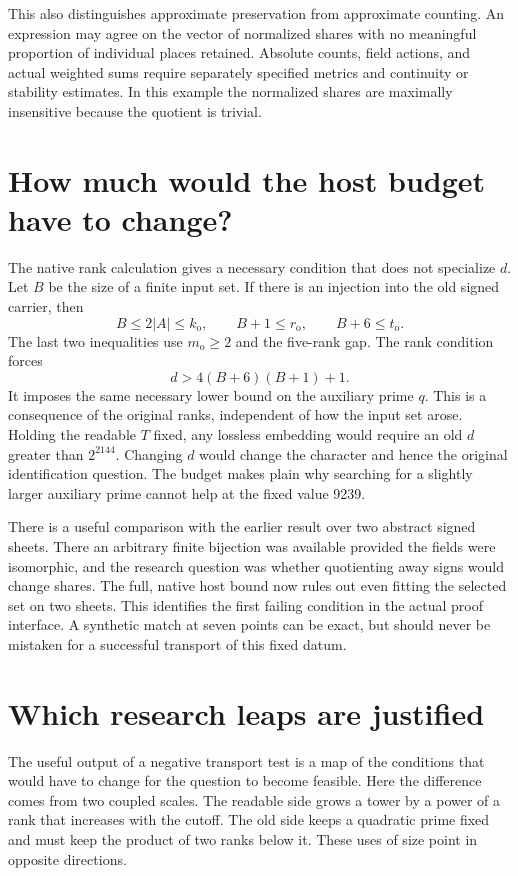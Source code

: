 \documentclass[12pt,letterpaper]{article}
\begin{document}
This also distinguishes approximate preservation from approximate counting. An expression may agree on the vector of normalized shares with no meaningful proportion of individual places retained. Absolute counts, field actions, and actual weighted sums require separately specified metrics and continuity or stability estimates. In this example the normalized shares are maximally insensitive because the quotient is trivial.


\section{How much would the host budget have to change?}\label{sec:primebudget}
The native rank calculation gives a necessary condition that does not specialize $d$. Let $B$ be the size of a finite input set. If there is an injection into the old signed carrier, then
\[
 B\le2|A|\le k_{\mathrm o},\qquad
 B+1\le r_{\mathrm o},\qquad
 B+6\le t_{\mathrm o}.
\]
The last two inequalities use $m_{\mathrm o}\ge2$ and the five-rank gap. The rank condition forces
\[
                  d>4(B+6)(B+1)+1.
\]
It imposes the same necessary lower bound on the auxiliary prime $q$. This is a consequence of the original ranks, independent of how the input set arose. Holding the readable $T$ fixed, any lossless embedding would require an old $d$ greater than $2^{2144}$. Changing $d$ would change the character and hence the original identification question. The budget makes plain why searching for a slightly larger auxiliary prime cannot help at the fixed value 9239.

There is a useful comparison with the earlier result over two abstract signed sheets. There an arbitrary finite bijection was available provided the fields were isomorphic, and the research question was whether quotienting away signs would change shares. The full, native host bound now rules out even fitting the selected set on two sheets. This identifies the first failing condition in the actual proof interface. A synthetic match at seven points can be exact, but should never be mistaken for a successful transport of this fixed datum.



\section{Which research leaps are justified}\label{sec:consequences}
The useful output of a negative transport test is a map of the conditions that would have to change for the question to become feasible. Here the difference comes from two coupled scales. The readable side grows a tower by a power of a rank that increases with the cutoff. The old side keeps a quadratic prime fixed and must keep the product of two ranks below it. These uses of size point in opposite directions.
\end{document}
